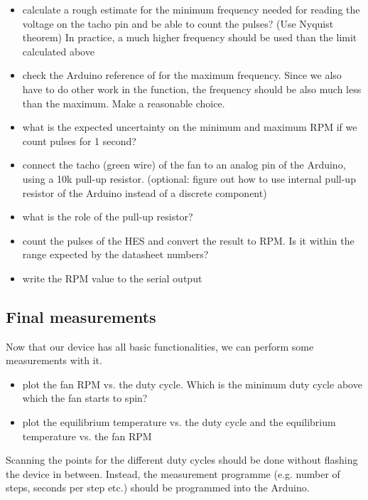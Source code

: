 \begin{itemize}
	\item calculate a rough estimate for the minimum frequency needed for reading the voltage on the tacho pin and be able to count the pulses? (Use Nyquist theorem) In practice, a much higher frequency should be used than the limit calculated above
	\item check the Arduino reference of  for the maximum frequency. Since we also have to do other work in the  function, the frequency should be also much less than the maximum. Make a reasonable choice.
    \item what is the expected uncertainty on the minimum and maximum RPM if we count pulses for 1 second?
	\item connect the tacho (green wire) of the fan to an analog pin of the Arduino, using a 10k pull-up resistor. (optional: figure out how to use internal pull-up resistor of the Arduino instead of a discrete component)
	\item what is the role of the pull-up resistor?
	\item count the pulses of the HES and convert the result to RPM. Is it within the range expected by the datasheet numbers?
	\item write the \ac{RPM} value to the serial output
\end{itemize}

\subsection{Final measurements}
Now that our device has all basic functionalities, we can perform some measurements with it.
\begin{itemize}
	\item plot the fan RPM vs. the duty cycle. Which is the minimum duty cycle above which the fan starts to spin?
	\item plot the equilibrium temperature vs. the duty cycle and the equilibrium temperature vs. the fan RPM
\end{itemize}

Scanning the points for the different duty cycles should be done without flashing the device in between. Instead, the measurement programme (e.g. number of steps, seconds per step etc.) should be programmed into the Arduino.


